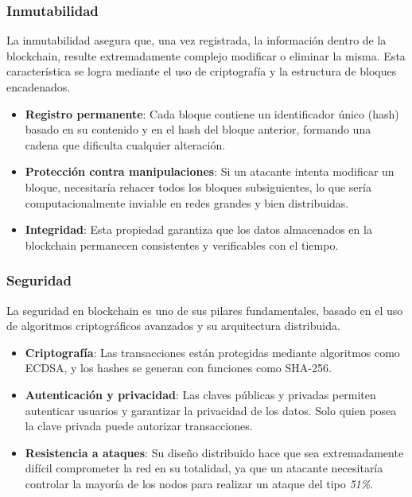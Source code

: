 \subsubsection{Inmutabilidad}  
La inmutabilidad asegura que, una vez registrada, la información dentro de la blockchain, resulte extremadamente complejo modificar o eliminar la misma. Esta característica se logra mediante el uso de criptografía y la estructura de bloques encadenados.

\begin{itemize}
    \item \textbf{Registro permanente}: Cada bloque contiene un identificador único (hash) basado en su contenido y en el hash del bloque anterior, formando una cadena que dificulta cualquier alteración.
    \item \textbf{Protección contra manipulaciones}: Si un atacante intenta modificar un bloque, necesitaría rehacer todos los bloques subsiguientes, lo que sería computacionalmente inviable en redes grandes y bien distribuidas.
    \item \textbf{Integridad}: Esta propiedad garantiza que los datos almacenados en la blockchain permanecen consistentes y verificables con el tiempo.
\end{itemize}

\subsubsection{Seguridad}  
La seguridad en blockchain es uno de sus pilares fundamentales, basado en el uso de algoritmos criptográficos avanzados y su arquitectura distribuida. 

\begin{itemize}
    \item \textbf{Criptografía}: Las transacciones están protegidas mediante algoritmos como ECDSA, y los hashes se generan con funciones como SHA-256.
    \item \textbf{Autenticación y privacidad}: Las claves públicas y privadas permiten autenticar usuarios y garantizar la privacidad de los datos. Solo quien posea la clave privada puede autorizar transacciones.
    \item \textbf{Resistencia a ataques}: Su diseño distribuido hace que sea extremadamente difícil comprometer la red en su totalidad, ya que un atacante necesitaría controlar la mayoría de los nodos para realizar un ataque del tipo \textit{51\%}.
\end{itemize}

